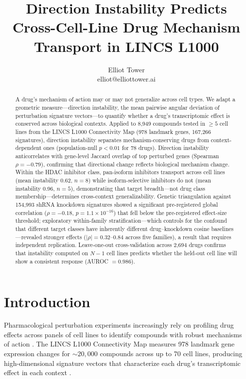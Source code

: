 \documentclass{article}
\title{Direction Instability Predicts Cross-Cell-Line Drug Mechanism Transport in LINCS L1000}
\author{\name Elliot Tower \\
      \email elliot@elliottower.ai}
\begin{document}
\maketitle

\begin{abstract}
A drug's mechanism of action may or may not generalize across cell types.
We adapt a geometric measure---direction instability, the mean pairwise
angular deviation of perturbation signature vectors---to quantify whether
a drug's transcriptomic effect is conserved across biological contexts.
Applied to 8{,}949 compounds tested in $\geq5$ cell lines from the LINCS
L1000 Connectivity Map (978 landmark genes, 167{,}266 signatures), direction
instability separates mechanism-conserving drugs from context-dependent ones
(population-null $p<0.01$ for 78 drugs). Direction instability anticorrelates
with gene-level Jaccard overlap of top perturbed genes (Spearman
$\rho=-0.79$), confirming that directional change reflects biological
mechanism change. Within the HDAC inhibitor class, pan-isoform inhibitors
transport across cell lines (mean instability 0.62, $n=8$) while
isoform-selective inhibitors do not (mean instability 0.96, $n=5$),
demonstrating that target breadth---not drug class membership---determines
cross-context generalizability. Genetic triangulation against 154{,}993
shRNA knockdown signatures showed a significant pre-registered global
correlation ($\rho = -0.18$, $p = 1.1 \times 10^{-16}$) that fell below
the pre-registered effect-size threshold; exploratory within-family
stratification---which controls for the confound that different target
classes have inherently different drug--knockdown cosine baselines---revealed
stronger effects ($|\rho| = 0.32$--$0.84$ across five families),
a result that requires independent replication. Leave-one-out
cross-validation across 2{,}694 drugs confirms that instability computed
on $N{-}1$ cell lines predicts whether the held-out cell line will show
a consistent response (AUROC $= 0.986$).
\end{abstract}

\section{Introduction}

Pharmacological perturbation experiments increasingly rely on profiling drug
effects across panels of cell lines to identify compounds with robust
mechanisms of action \citep{lamb2006connectivity,subramanian2017next}. The
LINCS L1000 Connectivity Map measures 978 landmark gene expression changes
for ${\sim}20{,}000$ compounds across up to 70 cell lines, producing
high-dimensional signature vectors that characterize each drug's
transcriptomic effect in each context \citep{subramanian2017next}.
\end{document}
